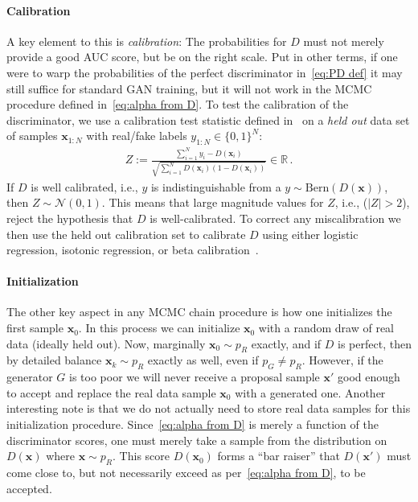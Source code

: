 \documentclass{article}
\renewcommand{\vec}[1]{{\boldsymbol{\mathbf{#1}}}} %
\newcommand{\R}{\mathbb{R}}
\newcommand{\sample}{\sim}
\newcommand{\norm}{\mathcal{N}}
\newcommand{\bern}{\textrm{Bern}}
\newcommand{\PG}{{p_G}}
\newcommand{\PR}{{p_R}}
\begin{document}
\paragraph{Calibration}
A key element to this is \emph{calibration}: The probabilities for $D$ must not merely provide a good AUC score, but be on the right scale.
Put in other terms, if one were to warp the probabilities of the perfect discriminator in~\eqref{eq:PD def} it may still suffice for standard GAN training, but it will not work in the MCMC procedure defined in~\eqref{eq:alpha from D}.
To test the calibration of the discriminator, we use a calibration test statistic defined in~\citet{Dawid1997} on a \emph{held out} data set of samples $\vec x_{1:N}$ with real/fake labels $y_{1:N} \in \{0,1\}^N$:
\begin{align}
  Z := \frac{\sum_{i=1}^N y_i - D(\vec x_i)}{\sqrt{\sum_{i=1}^N D(\vec x_i) (1 - D(\vec x_i))}} \in \R\,. \label{eq:calib score}
\end{align}
If $D$ is well calibrated, i.e., $y$ is indistinguishable from a $y \sample \bern(D(\vec x))$, then $Z \sample \norm(0,1)$.
This means that large magnitude values for $Z$, i.e., ($|Z| > 2$), reject the hypothesis that $D$ is well-calibrated.
To correct any miscalibration we then use the held out calibration set to calibrate $D$ using either logistic regression, isotonic regression, or beta calibration~\citep{Kull2017}.

\paragraph{Initialization}
The other key aspect in any MCMC chain procedure is how one initializes the first sample $\vec x_0$.
In this process we can initialize $\vec x_0$ with a random draw of real data (ideally held out)\@.
Now, marginally $\vec x_0 \sample \PR$ exactly, and if $D$ is perfect, then by detailed balance $\vec x_k \sample \PR$ exactly as well, even if $\PG \neq \PR$.
However, if the generator $G$ is too poor we will never receive a proposal sample $\vec x'$ good enough to accept and replace the real data sample $\vec x_0$ with a generated one.
Another interesting note is that we do not actually need to store real data samples for this initialization procedure.
Since~\eqref{eq:alpha from D} is merely a function of the discriminator scores, one must merely take a sample from the distribution on $D(\vec x)$ where $\vec x \sample \PR$.
This score $D(\vec x_0)$ forms a ``bar raiser'' that $D(\vec x')$ must come close to, but not necessarily exceed as per~\eqref{eq:alpha from D}, to be accepted.
\end{document}
